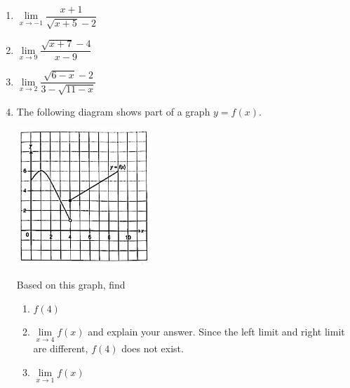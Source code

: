 \documentclass{report}
\begin{document}
\begin{multicols}{2}
\begin{enumerate}
            \item $\lim\limits_{x\to-1}{\dfrac{x+1}{\sqrt{x+5}-2}}$
            \item $\lim\limits_{x\to9}{\dfrac{\sqrt{x+7}-4}{x-9}}$
            \item $\lim\limits_{x\to2}{\dfrac{\sqrt{6-x}-2}{3-{\sqrt{11-x}}}}$
            \item The following diagram shows part of a graph $y = f(x)$.
                  \begin{center}
                        \includegraphics[width=0.4\textwidth]{./images/q4.jpeg}
                  \end{center}
                  Based on this graph, find
                  \begin{enumerate}
                        \item $f(4)$
                        \item $\lim\limits_{x\to4}{f(x)}$ and explain your answer.
                              Since the left limit and right limit are different, $f(4)$ does not exist.
                        \item $\lim\limits_{x\to1}{f(x)}$
                  \end{enumerate}
      \end{enumerate}
\end{multicols}
\end{document}
